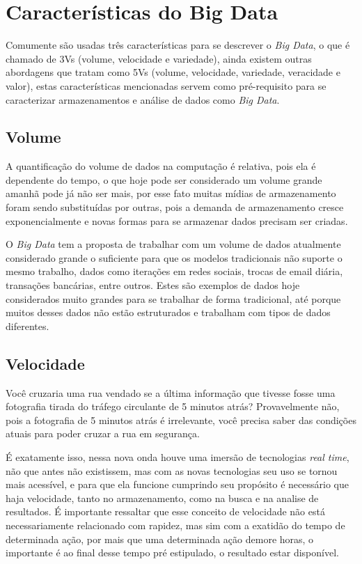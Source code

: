 \section{Características do Big Data}
\label{sec:funcbigdata}
Comumente são usadas três características para se descrever o \textit{Big Data}, o que é chamado de 3Vs (volume, velocidade e variedade), ainda existem outras abordagens que tratam como 5Vs (volume, velocidade, variedade, veracidade e valor), estas características mencionadas servem como pré-requisito para se caracterizar armazenamentos e análise de dados como \textit{Big Data}.

\subsection{Volume}
\label{subsec:volume}
A quantificação do volume de dados na computação é relativa, pois ela é dependente do tempo, o que hoje pode ser considerado um volume grande amanhã pode já não ser mais, por esse fato muitas mídias de armazenamento foram sendo substituídas por outras, pois a demanda de armazenamento cresce exponencialmente e novas formas para se armazenar dados precisam ser criadas.~\cite{forbes} 

O \textit{Big Data} tem a proposta de trabalhar com um volume de dados atualmente considerado grande o suficiente para que os modelos tradicionais não suporte o mesmo trabalho, dados como iterações em redes sociais, trocas de email diária, transações bancárias, entre outros. Estes são exemplos de dados hoje considerados muito grandes para se trabalhar de forma tradicional, até porque muitos desses dados não estão estruturados e trabalham com tipos de dados diferentes.~\cite{forbes}  

\subsection{Velocidade}
\label{subsec:velocidade}
\begin{citacao}
Você cruzaria uma rua vendado se a última informação que tivesse fosse uma fotografia tirada do tráfego circulante de 5 minutos atrás? Provavelmente não, pois a fotografia de 5 minutos atrás é irrelevante, você precisa saber das condições atuais para poder cruzar a rua em segurança.~\cite[p. 2]{forbes} 
\end{citacao}

É exatamente isso, nessa nova onda houve uma imersão de tecnologias \textit{real time}, não que antes não existissem, mas com as novas tecnologias seu uso se tornou mais acessível, e para que ela funcione cumprindo seu propósito é necessário que haja velocidade, tanto no armazenamento, como na busca e na analise de resultados. É importante ressaltar que esse conceito de velocidade não está necessariamente relacionado com rapidez, mas sim com a exatidão do tempo de determinada ação, por mais que uma determinada ação demore horas, o importante é ao final desse tempo pré estipulado, o resultado estar disponível.~\cite{forbes} 


